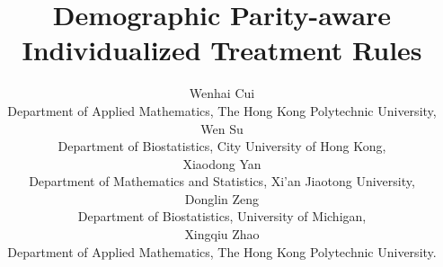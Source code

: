 \documentclass[12pt]{article}
\theoremstyle{plain}
\theoremstyle{definition}
\theoremstyle{remark}
\begin{document}
%
%







\title{\bf Demographic Parity-aware Individualized Treatment Rules }


%
%
%
%
%


\author{Wenhai Cui\\
    Department of Applied Mathematics, The Hong Kong Polytechnic University,\\
    Wen Su \\
    Department of Biostatistics, City University of Hong Kong,\\
    Xiaodong Yan\\
    Department of Mathematics and Statistics, Xi'an Jiaotong University,\\
    Donglin Zeng\\
    Department of Biostatistics, University of Michigan,\\
    Xingqiu Zhao\\
    Department of Applied Mathematics, The Hong Kong Polytechnic University.\\
   }


\maketitle
\end{document}
